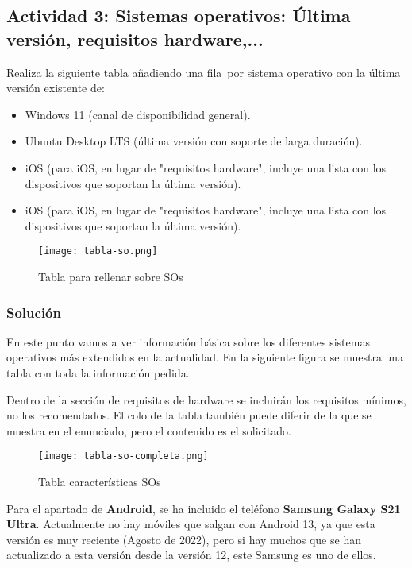 \subsection{Actividad 3:  Sistemas operativos: Última versión, requisitos hardware,...}
Realiza la siguiente tabla añadiendo una fila por sistema operativo con la última versión existente de:

\begin{itemize}
    \item Windows 11 (canal de disponibilidad general).
    \item Ubuntu Desktop LTS (última versión con soporte de larga duración).
    \item iOS (para iOS, en lugar de "requisitos hardware", incluye una lista con los dispositivos que soportan la última versión).
    \item iOS (para iOS, en lugar de "requisitos hardware", incluye una lista con los dispositivos que soportan la última versión).
\end{itemize}

\begin{figure}[ht]
    \centering
    \texttt{[image: tabla-so.png]}
    \caption{Tabla para rellenar sobre SOs}
\end{figure}

\subsubsection{Solución}
En este punto vamos a ver información básica sobre los diferentes sistemas operativos más extendidos en la actualidad. En la siguiente figura se muestra una tabla con toda la información pedida.

Dentro de la sección de requisitos de hardware se incluirán los requisitos mínimos, no los recomendados. El colo de la tabla también puede diferir de la que se muestra en el enunciado, pero el contenido es el solicitado.

\begin{figure}[ht]
    \centering
    \texttt{[image: tabla-so-completa.png]}
    \caption{Tabla características SOs}
\end{figure}

Para el apartado de \textbf{Android}, se ha incluido el teléfono \textbf{Samsung Galaxy S21 Ultra}. Actualmente no hay móviles que salgan con Android 13, ya que esta versión es muy reciente (Agosto de 2022), pero si hay muchos que se han actualizado a esta versión desde la versión 12, este Samsung es uno de ellos.

